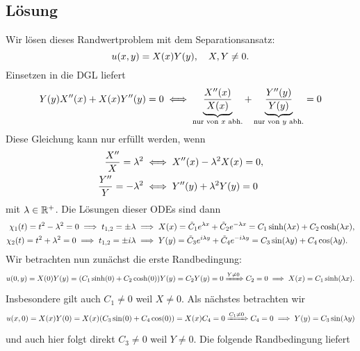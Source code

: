\documentclass{exercise}
\begin{document}
    \subsection*{Lösung}
    Wir lösen dieses Randwertproblem mit dem Separationsansatz:
    \[
        u\parentheses*{x, y} = X\parentheses*{x}Y\parentheses*{y}, \quad X, Y \ne 0.
    \]
    Einsetzen in die DGL liefert
    \[
        Y\parentheses*{y}X''\parentheses*{x} + X\parentheses*{x}Y''\parentheses*{y} = 0 \iff \underbrace{\frac{X''\parentheses*{x}}{X\parentheses*{x}}}_{\text{nur von }x\text{ abh.}} + \underbrace{\frac{Y''\parentheses*{y}}{Y\parentheses*{y}}}_{\text{nur von }y\text{ abh.}} = 0
    \]
    Diese Gleichung kann nur erfüllt werden, wenn
    \begin{align*}
        \frac{X''}{X} = \lambda^2 &\iff X''\parentheses*{x} - \lambda^2 X\parentheses*{x} = 0,\\
        \frac{Y''}{Y} = -\lambda^2 &\iff Y''\parentheses*{y} + \lambda^2 Y\parentheses*{y} = 0
    \end{align*}
    mit \(\lambda \in \mathbb{R}^+\).
    Die Lösungen dieser ODEs sind dann
    \begin{align*}
        \chi_1\parentheses*{t} = t^2 - \lambda^2 = 0 \implies t_{1, 2} = \pm\lambda &\implies X\parentheses*{x} = \tilde{C}_1 e^{\lambda x} + \tilde{C}_2 e^{-\lambda x} = C_1 \sinh\parentheses*{\lambda x} + C_2 \cosh\parentheses*{\lambda x},\\
        \chi_2\parentheses*{t} = t^2 + \lambda^2 = 0 \implies t_{1, 2} = \pm i\lambda &\implies Y\parentheses*{y} = \tilde{C}_3 e^{i\lambda y} + \tilde{C}_4 e^{-i\lambda y} = C_3 \sin\parentheses*{\lambda y} + C_4 \cos\parentheses*{\lambda y}.
    \end{align*}
    Wir betrachten nun zunächst die erste Randbedingung:
    \[
        u\parentheses*{0, y} = X\parentheses*{0}Y\parentheses*{y} = \parentheses*{C_1 \sinh\parentheses*{0} + C_2 \cosh\parentheses*{0}}Y\parentheses*{y} = C_2 Y\parentheses*{y} = 0 \xRightarrow{Y \ne 0} C_2 = 0 \implies X\parentheses*{x} = C_1 \sinh\parentheses*{\lambda x}.
    \]
    Insbesondere gilt auch \(C_1 \ne 0\) weil \(X \ne 0\).
    Als nächstes betrachten wir
    \[
        u\parentheses*{x, 0} = X\parentheses*{x}Y\parentheses*{0} = X\parentheses*{x}\parentheses*{C_3 \sin\parentheses*{0} + C_4 \cos\parentheses*{0}} = X\parentheses*{x}C_4 = 0 \xRightarrow{C_1 \ne 0} C_4 = 0 \implies Y\parentheses*{y} = C_3 \sin\parentheses*{\lambda y}
    \]
    und auch hier folgt direkt \(C_3 \ne 0\) weil \(Y \ne 0\).
    Die folgende Randbedingung liefert
\end{document}
